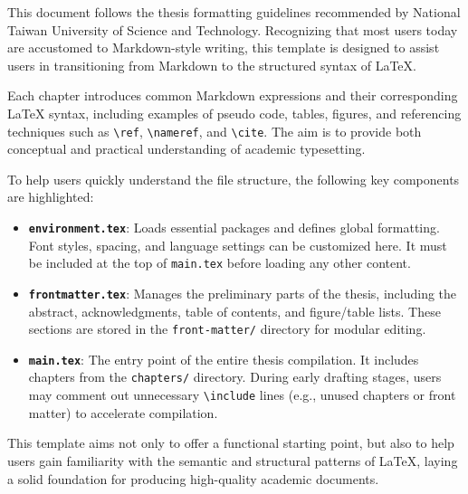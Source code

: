 \newpage
\enHeader{\enAbstractTitle}
\normalsize


This document follows the thesis formatting guidelines recommended by National Taiwan University of Science and Technology. Recognizing that most users today are accustomed to Markdown-style writing, this template is designed to assist users in transitioning from Markdown to the structured syntax of \LaTeX{}.

Each chapter introduces common Markdown expressions and their corresponding \LaTeX{} syntax, including examples of pseudo code, tables, figures, and referencing techniques such as \verb|\ref|, \verb|\nameref|, and \verb|\cite|. The aim is to provide both conceptual and practical understanding of academic typesetting.

To help users quickly understand the file structure, the following key components are highlighted:

\begin{itemize}
  \item \textbf{\texttt{environment.tex}}: Loads essential packages and defines global formatting. Font styles, spacing, and language settings can be customized here. It must be included at the top of \texttt{main.tex} before loading any other content.

  \item \textbf{\texttt{frontmatter.tex}}: Manages the preliminary parts of the thesis, including the abstract, acknowledgments, table of contents, and figure/table lists. These sections are stored in the \texttt{front-matter/} directory for modular editing.

  \item \textbf{\texttt{main.tex}}: The entry point of the entire thesis compilation. It includes chapters from the \texttt{chapters/} directory. During early drafting stages, users may comment out unnecessary \texttt{\textbackslash include} lines (e.g., unused chapters or front matter) to accelerate compilation.
\end{itemize}

This template aims not only to offer a functional starting point, but also to help users gain familiarity with the semantic and structural patterns of \LaTeX{}, laying a solid foundation for producing high-quality academic documents.
